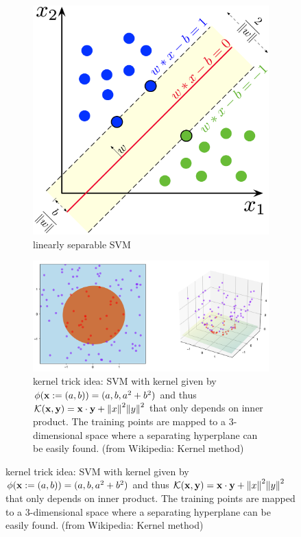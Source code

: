 \begin{figure}[!ht]
	\centering
	\begin{subfigure}{0.3\textwidth}
	\centering
		\includegraphics[width=.9\linewidth]{SVM_margin.png}
		\caption{linearly separable SVM}
	\end{subfigure}
	\begin{subfigure}{0.68\textwidth}
	\centering
		\includegraphics[width=.9\linewidth]{kernel_trick_idea.png}
		\caption{kernel trick idea: SVM with kernel given by $\phi(\vb{x}:=(a, b)) = (a, b, a^2 + b^2)$ and thus $\mathcal{K}(\vb{x},\vb{y})=\vb{x}\cdot \vb{y}+\norm{x}^2 \norm{y}^2$ that only depends on inner product. The training points are mapped to a 3-dimensional space where a separating hyperplane can be easily found. (from Wikipedia: Kernel method)}	
	\end{subfigure}
\end{figure}
